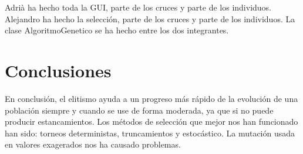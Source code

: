 \documentclass[twoside]{AiTeX}
\begin{document}
Adrià ha hecho toda la GUI, parte de los cruces y parte de los individuos. Alejandro ha hecho la selección, parte de los cruces y parte de los individuos. La clase AlgoritmoGenetico se ha hecho entre los dos integrantes.

\section{Conclusiones}

En conclusión, el elitismo ayuda a un progreso más rápido de la evolución de una población siempre y cuando se use de forma moderada, ya que si no puede producir estancamientos. Los métodos de selección que mejor nos han funcionado han sido: torneos deterministas, truncamientos y estocástico. La mutación usada en valores exagerados nos ha causado problemas.
\end{document}
